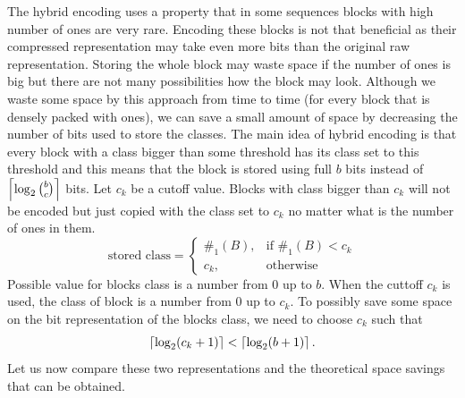 The hybrid encoding uses a property that in some sequences blocks with high number
of ones are very rare. Encoding these blocks is not that beneficial as their
compressed representation may take even more bits than the original raw
representation. Storing the whole block may waste space if the number of
ones is big but there are not many possibilities how the block may look.
Although we waste some space by this approach from time to time (for every
block that is densely packed with ones), we can save a small amount of space
by decreasing the number of bits used to store the classes. The main idea
of hybrid encoding is that every block with a class bigger than some threshold
has its class set to this threshold and this means that the block
is stored using full $b$ bits instead of $\left\lceil \log_2{b\choose c} \right\rceil$ bits.
Let $c_k$ be a cutoff value. Blocks with class bigger than $c_k$ will not be
encoded but just copied with the class set to $c_k$ no matter what is the
number of ones in them.
\[
    \text{stored class} = 
\begin{cases}
    \#_1(B),& \text{if } \#_1(B) < c_k\\
    c_k,              & \text{otherwise}
\end{cases}
\]
Possible value for blocks class is a number from 0 up to $b$. When the cuttoff $c_k$ is
used, the class of block is a number from 0 up to $c_k$. To possibly save some space on
the bit representation of the blocks class, we need to choose $c_k$ such that
$$\left\lceil \log_2(c_k+1) \right\rceil < \left\lceil \log_2(b+1) \right\rceil.$$ Let us now compare these two representations
and the theoretical space savings that can be obtained.

